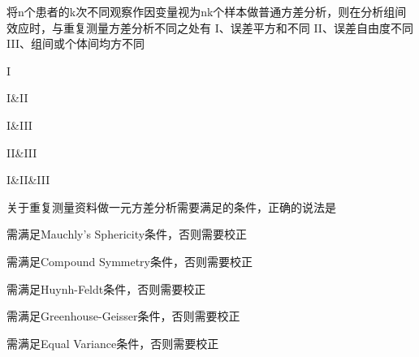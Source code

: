 \par\addvspace{6pt}\noindent\begin{minipage}{\linewidth}


将n个患者的k次不同观察作因变量视为nk个样本做普通方差分析，则在分析组间效应时，与重复测量方差分析不同之处有 I、误差平方和不同 II、误差自由度不同 III、组间或个体间均方不同


\begin{choices}

\item I

\item I\&II

\item I\&III

\item II\&III

\item I\&II\&III

\end{choices}

\end{minipage}\par\vspace{4pt}

\par\addvspace{6pt}\noindent\begin{minipage}{\linewidth}


关于重复测量资料做一元方差分析需要满足的条件，正确的说法是


\begin{choices}

\item 需满足Mauchly's Sphericity条件，否则需要校正

\item 需满足Compound Symmetry条件，否则需要校正

\item 需满足Huynh-Feldt条件，否则需要校正

\item 需满足Greenhouse-Geisser条件，否则需要校正

\item 需满足Equal Variance条件，否则需要校正

\end{choices}

\end{minipage}\par\vspace{4pt}

